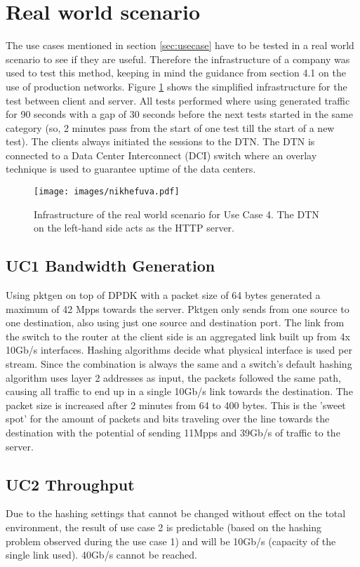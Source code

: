 \section{Real world scenario}
The use cases mentioned in section \ref{sec:usecase} have to be tested in a real world scenario to see if they are useful. Therefore the infrastructure of a company was used to test this method, keeping in mind the guidance from section 4.1 on the use of production networks.
Figure \ref{fig:nikhefuva} shows the simplified infrastructure for the test between client and server. All tests performed where using generated traffic for 90 seconds with a gap of 30 seconds before the next tests started in the same category (so, 2 minutes pass from the start of one test till the start of a new test). The clients always initiated the sessions to the DTN. The DTN is connected to a Data Center Interconnect (DCI) switch where an overlay technique is used to guarantee uptime of the data centers. 

\begin{figure}
  \texttt{[image: images/nikhefuva.pdf]}
  \caption{Infrastructure of the real world scenario for Use Case 4. The DTN on the left-hand side acts as the HTTP server.}
  \label{fig:nikhefuva}
\end{figure}

\subsection{UC1 Bandwidth Generation}
Using pktgen on top of DPDK with a packet size of 64 bytes generated a maximum of 42 Mpps towards the server. Pktgen only sends from one source to one destination, also using just one source and destination port. The link from the switch to the router at the client side is an aggregated link built up from 4x 10Gb/s interfaces. Hashing algorithms decide what physical interface is used per stream. Since the combination is always the same and a switch's default hashing algorithm uses layer 2 addresses as input, the packets followed the same path, causing all traffic to end up in a single 10Gb/s link towards the destination. The packet size is increased after 2 minutes from 64 to 400 bytes. This is the 'sweet spot' for the amount of packets and bits traveling over the line towards the destination with the potential of sending 11Mpps and 39Gb/s of traffic to the server.  

\subsection{UC2 Throughput}
Due to the hashing settings that cannot be changed without effect on the total environment, the result of use case 2 is predictable (based on the hashing problem observed during the use case 1) and will be 10Gb/s (capacity of the single link used). 40Gb/s cannot be reached.

